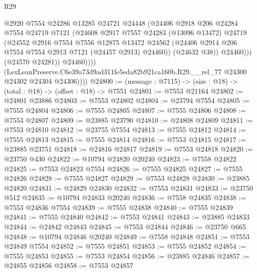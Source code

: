 \begin{lexlean}{R29}
\begin{coremodule}
                        @2920
                        @7554
                        @24286
                        @13285
                        @24721
                        @24448
                        (@24406
                          @2918
                          @206
                          @24284
                          @7554
                          @24719
                          @7121
                          (@24608
                            @2917
                            @7557
                            @24283
                            (@13096 @13472)
                            @24719
                            (@24552
                              @2916
                              @7554
                              @7556
                              @12875
                              @13472
                              @24562
                              (@24406 @2914 @206 @7554 @7554 @2913 @7121 (@24457 @2913) @24460))
                            (@24632 @38))
                          @24460)))
                    (@24570 @24281))
                  @24460))))
          (LexLeanPreserve.C6e39a73d9ad311fe5eda82b921ca160b.R29.__rel_77
            @24300
            @24302
            @24304
            @24306))))
@24800 := (message : @7115) -> (size : @18) -> (total : @18) -> (offset : @18) -> @7551
@24801 := @7553 @21164
@24802 := @24801 @23886
@24803 := @7553 @24802
@24804 := @23794 @7554
@24805 := @7555 @24804
@24806 := @7555 @24805
@24807 := @7555 @24806
@24808 := @7553 @24807
@24809 := @23885 @23790
@24810 := @24808 @24809
@24811 := @7553 @24810
@24812 := @23755 @7554
@24813 := @7555 @24812
@24814 := @7555 @24813
@24815 := @7555 @24814
@24816 := @7553 @24815
@24817 := @23885 @23751
@24818 := @24816 @24817
@24819 := @7553 @24818
@24820 := @23750 @430
@24822 := @10794 @24820 @20240
@24823 := @7558 @24822
@24825 := @7553 @24823 @7554
@24826 := @7555 @24825
@24827 := @7555 @24826
@24828 := @7555 @24827
@24829 := @7553 @24828
@24830 := @23885 @24820
@24831 := @24829 @24830
@24832 := @7553 @24831
@24833 := @23750 @512
@24835 := @10794 @24833 @20240
@24836 := @7558 @24835
@24838 := @7553 @24836 @7554
@24839 := @7555 @24838
@24840 := @7555 @24839
@24841 := @7555 @24840
@24842 := @7553 @24841
@24843 := @23885 @24833
@24844 := @24842 @24843
@24845 := @7553 @24844
@24846 := @23750 @665
@24848 := @10794 @24846 @20240
@24849 := @7558 @24848
@24851 := @7553 @24849 @7554
@24852 := @7555 @24851
@24853 := @7555 @24852
@24854 := @7555 @24853
@24855 := @7553 @24854
@24856 := @23885 @24846
@24857 := @24855 @24856
@24858 := @7553 @24857

\end{coremodule}
\end{lexlean}
